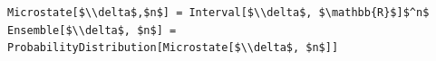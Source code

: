 \documentclass[border=10pt]{standalone}
\begin{document}
\begin{lstlisting}
Microstate[$\\delta$,$n$] = Interval[$\\delta$, $\mathbb{R}$]$^n$
Ensemble[$\\delta$, $n$] = ProbabilityDistribution[Microstate[$\\delta$, $n$]]
\end{lstlisting}
\end{document}
